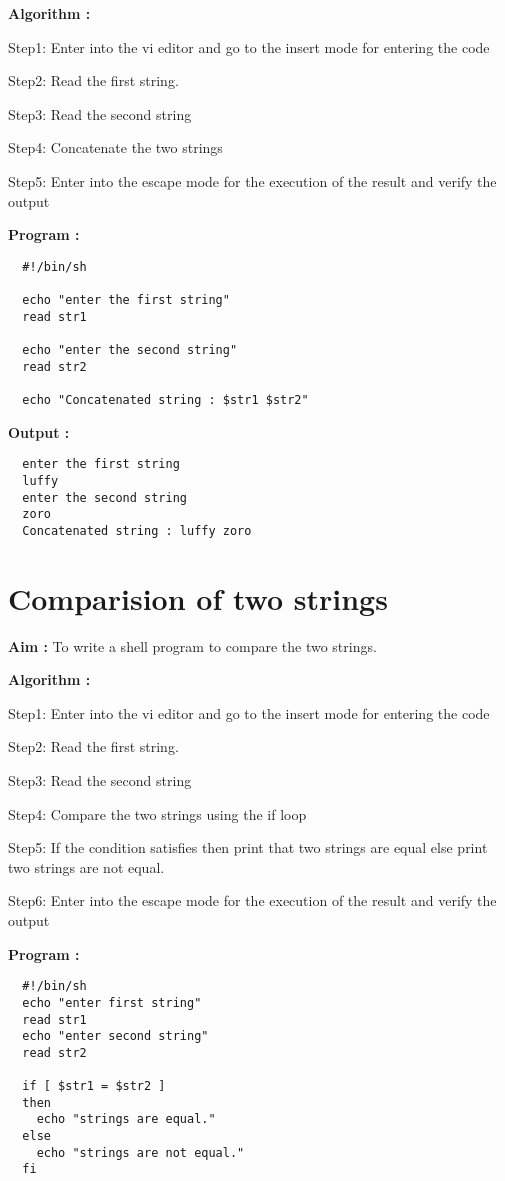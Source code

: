\documentclass[journal,onecolumn]{IEEEtran}
\begin{document}
\textbf{Algorithm :}
\begin{list}{}{}
  \item Step1: Enter into the vi editor and go to the insert mode for entering the code
  \item Step2: Read the first string.
  \item Step3: Read the second string
  \item Step4: Concatenate the two strings
  \item Step5: Enter into the escape mode for the execution of the result and verify the output
\end{list}


\textbf{Program :}
\begin{verbatim}
  #!/bin/sh

  echo "enter the first string"
  read str1
  
  echo "enter the second string"
  read str2
  
  echo "Concatenated string : $str1 $str2"
\end{verbatim}

\textbf{Output :}
\begin{verbatim}
  enter the first string
  luffy
  enter the second string
  zoro
  Concatenated string : luffy zoro
\end{verbatim}

\section{Comparision of two strings}
\textbf{Aim : } To write a shell program to compare the two strings.

\textbf{Algorithm : }
\begin{list}{}{}
  \item Step1: Enter into the vi editor and go to the insert mode for entering the code
  \item Step2: Read the first string.
  \item Step3: Read the second string
  \item Step4: Compare the two strings using the if loop
  \item Step5: If the condition satisfies then print that two strings are equal else print
        two strings are not equal.
  \item Step6: Enter into the escape mode for the execution of the result and verify the output
\end{list}

\textbf{Program : }
\begin{verbatim}
  #!/bin/sh
  echo "enter first string"
  read str1
  echo "enter second string"
  read str2

  if [ $str1 = $str2 ] 
  then
    echo "strings are equal."
  else
    echo "strings are not equal."
  fi
\end{verbatim}
\end{document}
